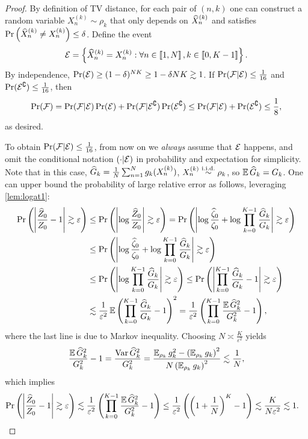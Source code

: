 \begin{proof}
    By definition of TV distance, for each pair of $(n,k)$ one can construct a random variable $X_n^{(k)}\sim\rho_k$ that only depends on $\widehat{X}_n^{(k)}$ and satisfies $\operatorname{Pr}\left(\widehat{X}_n^{(k)}\ne X_n^{(k)}\right)\le\delta$. Define the event
    $$\mathcal{E}=\left\{\widehat{X}_n^{(k)}=X_n^{(k)}:\forall n\in\left[\!\left[1,N\right]\!\right],k\in\left[\!\left[0,K-1\right]\!\right]\right\}.$$
   By independence, $\operatorname{Pr}(\mathcal{E})\ge(1-\delta)^{NK}\ge1-\delta NK\gtrsim1$. If $\operatorname{Pr}(\mathcal{F}|\mathcal{E})\le\frac{1}{16}$ and $\operatorname{Pr}(\mathcal{E}^\complement)\le\frac{1}{16}$, then
    $$\operatorname{Pr}(\mathcal{F})=\operatorname{Pr}(\mathcal{F}|\mathcal{E})\operatorname{Pr}(\mathcal{E})+\operatorname{Pr}(\mathcal{F}|\mathcal{E}^\complement)\operatorname{Pr}(\mathcal{E}^\complement)\le\operatorname{Pr}(\mathcal{F}|\mathcal{E})+\operatorname{Pr}(\mathcal{E}^\complement)\le\frac{1}{8},$$
    as desired.

    To obtain $\operatorname{Pr}(\mathcal{F}|\mathcal{E})\le\frac{1}{16}$, from now on we \emph{always} assume that $\mathcal{E}$ happens, and omit the conditional notation $(\cdot|\mathcal{E})$ in probability and expectation for simplicity. Note that in this case, $\widehat{G}_k=\frac{1}{N}\sum_{n=1}^Ng_k(X_n^{(k)})$, $X_n^{(k)}\stackrel{\mathrm{i.i.d.}}{\sim}\rho_k$, so $\operatorname{\mathbb{E}}\widehat{G}_k=G_k$. One can upper bound the probability of large relative error as follows, leveraging \cref{lem:logat1}:
    \begin{align*}
        \operatorname{Pr}\left(\left|\frac{\widehat{Z}_0}{Z_0}-1\right|\gtrsim\varepsilon\right) & \le\operatorname{Pr}\left(\left|\log\frac{\widehat{Z}_0}{Z_0}\right|\gtrsim\varepsilon\right)=\operatorname{Pr}\left(\left|\log\frac{\widehat{\zeta}_0}{\zeta_0}+\log\prod_{k=0}^{K-1}\frac{\widehat{G}_k}{G_k}\right|\gtrsim\varepsilon\right) \\
                                                           & \le\operatorname{Pr}\left(\left|\log\frac{\widehat{\zeta}_0}{\zeta_0}+\log\prod_{k=0}^{K-1}\frac{\widehat{G}_k}{G_k}\right|\gtrsim\varepsilon\right)                                                      \\
                                                           & \le\operatorname{Pr}\left(\left|\log\prod_{k=0}^{K-1}\frac{\widehat{G}_k}{G_k}\right|\gtrsim\varepsilon\right)\le\operatorname{Pr}\left(\left|\prod_{k=0}^{K-1}\frac{\widehat{G}_k}{G_k}-1\right|\gtrsim\varepsilon\right)             \\
                                                           & \lesssim\frac{1}{\varepsilon^2}\operatorname{\mathbb{E}}\left(\prod_{k=0}^{K-1}\frac{\widehat{G}_k}{G_k}-1\right)^2=\frac{1}{\varepsilon^2}\left(\prod_{k=0}^{K-1}\frac{\operatorname{\mathbb{E}}\widehat{G}_k^2}{G_k^2}-1\right),
    \end{align*}
    where the last line is due to Markov inequality. Choosing $N\asymp\frac{K}{\varepsilon^2}$ yields
    $$\frac{\operatorname{\mathbb{E}}\widehat{G}_k^2}{G_k^2}-1=\frac{\operatorname{Var}\widehat{G}_k^2}{G_k^2}=\frac{\operatorname{\mathbb{E}}_{\rho_k}g_k^2-\left(\operatorname{\mathbb{E}}_{\rho_k}g_k\right)^2}{N\left(\operatorname{\mathbb{E}}_{\rho_k}g_k\right)^2}\lesssim\frac{1}{N},$$
    which implies
    \begin{align*}
        \operatorname{Pr}\left(\left|\frac{\widehat{Z}_0}{Z_0}-1\right|\gtrsim\varepsilon\right) & \lesssim\frac{1}{\varepsilon^2}\left(\prod_{k=0}^{K-1}\frac{\operatorname{\mathbb{E}}\widehat{G}_k^2}{G_k^2}-1\right)\le\frac{1}{\varepsilon^2}\left(\left(1+\frac{1}{N}\right)^K-1\right)\lesssim\frac{K}{N\varepsilon^2}\lesssim1.
    \end{align*}
\end{proof}

